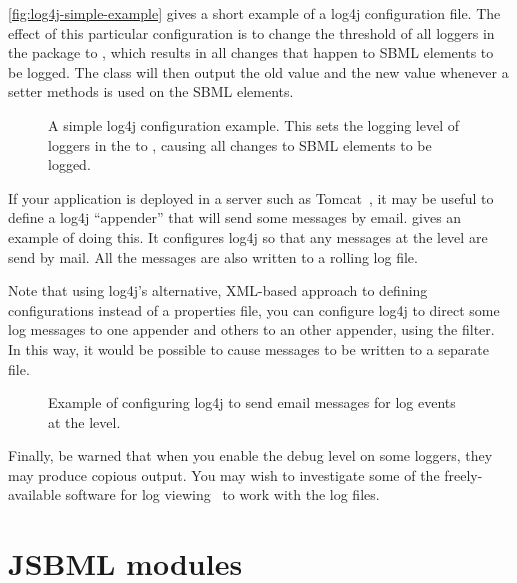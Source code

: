 \vref*{fig:log4j-simple-example} gives a short example of a log4j
configuration file.  The effect of this particular configuration is to
change the threshold of all loggers in the 
package to , which results in all changes that happen to SBML
elements to be logged. The class \SimpleTreeNodeChangeListener{}  will then
output the old value and the new value whenever a setter methods is used on
the SBML elements.

\begin{figure}[t]
  \caption{A simple log4j configuration example.  This sets the logging
    level of loggers in the  to ,
    causing all changes to SBML elements to be logged.}
  \label{fig:log4j-simple-example}
\end{figure}

If your application is deployed in a server such as Tomcat~\cite{tomcat},
it may be useful to define a log4j ``appender'' that will send some
messages by email.   gives an example
of doing this.  It configures log4j so that any messages at the
 level  are send by mail. All the messages are
also written to a rolling log file.

Note that using log4j's alternative, XML-based approach to defining
configurations instead of a properties file, you can configure log4j to
direct some log messages %
to one appender and others to an other appender, using the
 filter. In this way, it would be possible to cause
 messages to be written to a separate file.

\begin{figure}[t]
  \caption{Example of configuring log4j to send email messages for log
    events at the  level.}
  \label{fig:log4j-email-example}
\end{figure}


Finally, be warned that when you enable the debug level  on
some loggers, they may produce copious output.  You may wish to investigate
some of the freely-available software for log
viewing~\cite{logViewersWebpage} to work with the log files.


\section{JSBML modules}
\label{sec:jsbml-modules-details}

